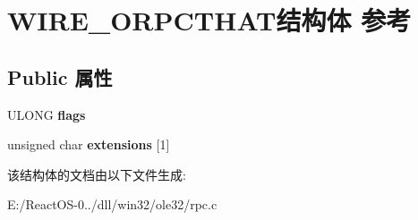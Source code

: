 \hypertarget{struct_w_i_r_e___o_r_p_c_t_h_a_t}{}\section{W\+I\+R\+E\+\_\+\+O\+R\+P\+C\+T\+H\+A\+T结构体 参考}
\label{struct_w_i_r_e___o_r_p_c_t_h_a_t}
\subsection*{Public 属性}
\begin{DoxyCompactItemize}
\item 
\mbox{\label{struct_w_i_r_e___o_r_p_c_t_h_a_t_abcdb8290a345351b1f3113c0a0bf27aa}} 
U\+L\+O\+NG {\bfseries flags}
\item 
\mbox{\label{struct_w_i_r_e___o_r_p_c_t_h_a_t_a043a07a073737947701b7c884056905c}} 
unsigned char {\bfseries extensions} \mbox{[}1\mbox{]}
\end{DoxyCompactItemize}


该结构体的文档由以下文件生成\+:\begin{DoxyCompactItemize}
\item 
E\+:/\+React\+O\+S-\/0../dll/win32/ole32/rpc.\+c\end{DoxyCompactItemize}
